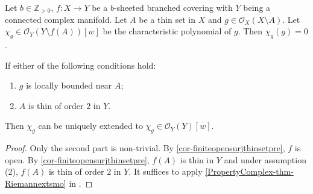 \begin{proposition}\label{prop-charpoly}
    Let $b\in \mathbb{Z}_{>0}$, $f:X\rightarrow Y$ be a $b$-sheeted branched covering with $Y$ being a connected complex manifold. Let $A$ be a thin set in $X$ and $g\in \mathcal{O}_X(X\setminus A)$. Let $\chi_g\in \mathcal{O}_Y(Y\setminus f(A))[w]$ be the characteristic polynomial of $g$. Then $\chi_g(g)=0$.

    If either of the following conditions hold:
    \begin{enumerate}
        \item $g$ is locally bounded near $A$;
        \item $A$ is thin of order $2$ in $Y$.
    \end{enumerate}
    Then $\chi_g$ can be uniquely extended to $\chi_g\in \mathcal{O}_Y(Y)[w]$.
\end{proposition}
\begin{proof}
    Only the second part is non-trivial. By \cref{cor-finiteopensurjthinsetpre}, $f$ is open. 
    By \cref{cor-finiteopensurjthinsetpre}, $f(A)$ is thin in $Y$ and under assumption (2), $f(A)$ is thin of order $2$ in $Y$. It suffices to apply \cref{PropertyComplex-thm-Riemannextsmo} in .
\end{proof}

